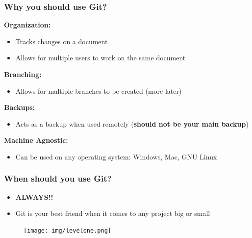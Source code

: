 \documentclass{beamer}
\begin{document}
\begin{frame}
	\frametitle{\textbf{Why you should use Git?}}
	
	\textbf{Organization:}
	\begin{itemize}
		\item Tracks changes on a document
		\item Allows for multiple users to work on the same document
	\end{itemize}

	\vspace{0.25cm}
	\textbf{Branching:}
	\begin{itemize}
		\item Allows for multiple branches to be created (more later)
	\end{itemize}

	\vspace{0.25cm}
	\textbf{Backups:}
	\begin{itemize}
		\item Acts as a backup when used remotely (\textbf{should not be your main backup})
	\end{itemize}

	\vspace{0.25cm}
	\textbf{Machine Agnostic:}
	\begin{itemize}
		\item Can be used on any operating system: Windows, Mac, GNU Linux
	\end{itemize}

\end{frame}


\begin{frame} 
	\frametitle{\textbf{When should you use Git?}}
	\begin{itemize}
		\item \textbf{ALWAYS!!}
		\item Git is your best friend when it comes to any project big or small  
	\end{itemize}
\end{frame}

\begin{frame}
	\begin{figure}[h]
	\centering
	\texttt{[image: img/levelone.png]} 
	\end{figure}
\end{frame}
\end{document}
